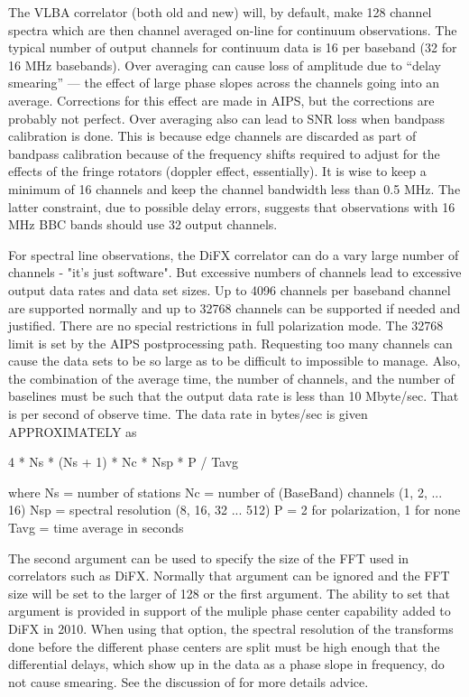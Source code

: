 \documentclass{report}
\begin{document}
The VLBA correlator (both old and new) will, by default, make 128
channel spectra which are then channel averaged on-line for continuum
observations.  The typical number of output channels for continuum
data is 16 per baseband (32 for 16 MHz basebands).  Over averaging can
cause loss of amplitude due to ``delay smearing'' --- the effect of
large phase slopes across the channels going into an average.
Corrections for this effect are made in AIPS, but the corrections are
probably not perfect.  Over averaging also can lead to SNR loss when
bandpass calibration is done.  This is because edge channels are
discarded as part of bandpass calibration because of the frequency
shifts required to adjust for the effects of the fringe rotators
(doppler effect, essentially).  It is wise to keep a minimum of 16
channels and keep the channel bandwidth less than 0.5 MHz.  The latter
constraint, due to possible delay errors, suggests that observations
with 16 MHz BBC bands should use 32 output channels.

For spectral line observations, the DiFX correlator can do a vary large
number of channels - "it's just software".  But excessive numbers
of channels lead to excessive output data rates and data set sizes.
Up to 4096 channels per baseband channel are supported normally and
up to 32768 channels can be supported if needed and justified.  There
are no special restrictions in full polarization mode.  The 32768 limit
is set by the AIPS postprocessing path.  Requesting too
many channels can cause the data sets to be so large as to be
difficult to impossible to manage.  Also, the combination of the
average time, the number of channels, and the number of baselines must
be such that the output data rate is less than 10 Mbyte/sec.  That is
per second of observe time.  The
data rate in bytes/sec is given APPROXIMATELY as

    4 * Ns * (Ns + 1) * Nc * Nsp * P / Tavg

 where Ns   = number of stations
       Nc   = number of (BaseBand) channels (1, 2, ... 16)
       Nsp  = spectral resolution (8, 16, 32 ... 512)
       P    = 2 for polarization, 1 for none
       Tavg = time average in seconds

The second argument can be used to specify the size of the FFT used in
correlators such as DiFX.  Normally that argument can be ignored and
the FFT size will be set to the larger of 128 or the first argument.
The ability to set that argument is provided in support of the muliple
phase center capability added to DiFX in 2010.  When using that
option, the spectral resolution of the transforms done before the
different phase centers are split must be high enough that the
differential delays, which show up in the data as a phase slope in
frequency, do not cause smearing.  See the discussion of
 for
more details advice.
\end{document}
